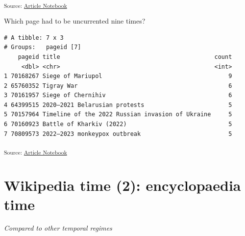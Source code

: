 \documentclass[
  Crown,
  times,
  sageh]{sagej}
\begin{document}
\textsubscript{Source:
\href{https://wikihistories.github.io/the-bot-that-makes-history/the-bot-that-makes-history-preview.html}{Article
Notebook}}

Which page had to be uncurrented nine times?

\begin{verbatim}
# A tibble: 7 x 3
# Groups:   pageid [7]
    pageid title                                            count
     <dbl> <chr>                                            <int>
1 70168267 Siege of Mariupol                                    9
2 65760352 Tigray War                                           6
3 70161957 Siege of Chernihiv                                   6
4 64399515 2020–2021 Belarusian protests                        5
5 70157964 Timeline of the 2022 Russian invasion of Ukraine     5
6 70160923 Battle of Kharkiv (2022)                             5
7 70809573 2022–2023 monkeypox outbreak                         5
\end{verbatim}

\textsubscript{Source:
\href{https://wikihistories.github.io/the-bot-that-makes-history/the-bot-that-makes-history-preview.html}{Article
Notebook}}

\section{Wikipedia time (2): encyclopaedia
time}\label{wikipedia-time-2-encyclopaedia-time}

\emph{Compared to other temporal regimes}


\end{document}

